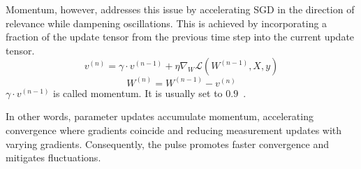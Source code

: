 Momentum, however, addresses this issue by accelerating SGD in the direction of relevance while dampening oscillations. 
This is achieved by incorporating a fraction of the update tensor from the previous time step into 
the current update tensor. 
\[v^{(n)}=\gamma \cdot v^{(n-1)} + \eta \nabla_W \mathcal{L}(W^{(n-1)}, X, y)\]
\[W^{(n)} = W^{(n-1)} - v ^{(n)}\]
$\gamma \cdot v^{(n-1)}$ is called momentum. It is usually set to $0.9$~\cite{sgd}. 

In other words, parameter updates accumulate momentum, accelerating convergence where gradients coincide and reducing measurement updates with 
varying gradients. Consequently, the pulse promotes faster convergence and mitigates fluctuations.

\begin{figure}[h]
    \begin{center}

\end{center}
\end{figure}
